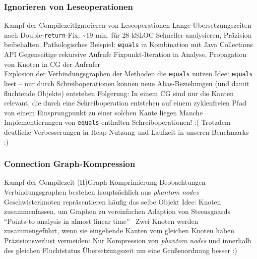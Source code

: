 \documentclass[usenames,dvipsnames,smaller]{beamer}
\begin{document}
			\subsubsection{Ignorieren von Leseoperationen}
				\begin{frame}{Kampf der Compilezeit}{Ignorieren von Leseoperationen}
					\bi
						\ii Lange Übersetzungszeiten nach Double-\texttt{return}-Fix: \textasciitilde 19 min. für 28 kSLOC
							\bi
								\ii[$\Rightarrow$] Schneller analysieren, Präzision beibehalten. 
							\ei
						\ii<2-> Pathologisches Beispiel: \texttt{equals} in Kombination mit Java Collections API
							\bi
								\ii Gegenseitige rekursive Aufrufe
								\ii Fixpunkt-Iteration in Analyse, Propagation von Knoten in CG der Aufrufer\\
								\structure{$\Rightarrow$} Explosion der Verbindungsgraphen der Methoden die \texttt{equals} nutzen
							\ei
						\ii<3-> Idee: \texttt{equals} liest -- nur durch Schreiboperationen können neue Alias-Beziehungen (und damit flüchtende Objekte) entstehen
							\bi
								\ii Folgerung: In einem CG sind nur die Kanten relevant, die
									\bi
										\ii durch eine Schreiboperation entstehen
										\ii auf einem zyklenfreien Pfad von einem Einsprungpunkt zu einer solchen Kante liegen
									\ei
							\ei
						\ii<4-> Manche Implementierungen von \texttt{equals} enthalten Schreiboperationen! :(
						\ii<4-> Trotzdem deutliche Verbesserungen in Heap-Nutzung und Laufzeit in unseren Benchmarks :)
					\ei
				\end{frame}

			\subsubsection{Connection Graph-Kompression}
				\begin{frame}{Kampf der Compilezeit (II)}{Graph-Komprimierung}
					\bi
						\ii Beobachtungen
							\bi
								\ii Verbindungsgraphen bestehen hauptsächlich aus \emph{phantom nodes}
								\ii Geschwisterknoten repräsentieren häufig das selbe Objekt
							\ei
						\ii Idee: Knoten zusammenfassen, um Graphen zu vereinfachen
						\ii<2-> Adaption von Steensgaards \enquote{Points-to analysis in almost linear time}~\cite{steensgaard:96:popl}
							\bi
								\ii Zwei Knoten werden zusammengeführt, wenn sie eingehende Kanten vom gleichen Knoten haben
								\ii Präzisionsverlust vermeiden: Nur Kompression von \emph{phantom nodes} und innerhalb des gleichen Fluchtstatus
							\ei
						\ii<3-> Übersetzungszeit um eine Größenordnung besser :)
					\ei
				\end{frame}
\end{document}
